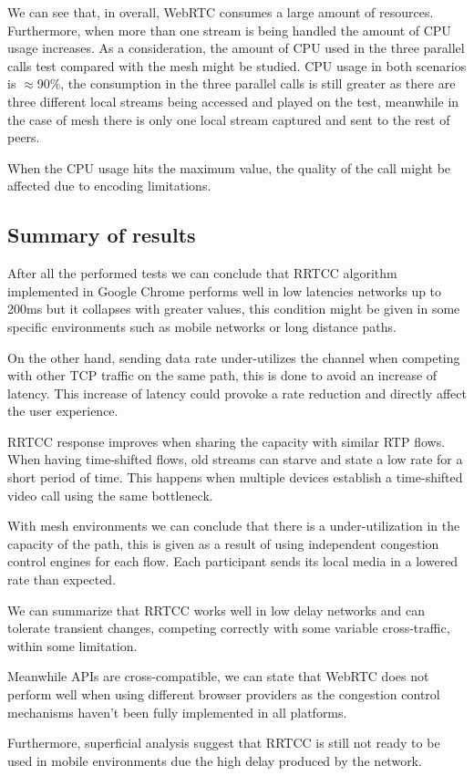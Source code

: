 We can see that, in overall, WebRTC consumes a large amount of resources. Furthermore, when more than one stream is being handled the amount of CPU usage increases. As a consideration, the amount of CPU used in the three parallel calls test compared with the mesh might be studied. CPU usage in both scenarios is $\approx$90\%, the consumption in the three parallel calls is still greater as there are three different local streams being accessed and played on the test, meanwhile in the case of mesh there is only one local stream captured and sent to the rest of peers.

When the CPU usage hits the maximum value, the quality of the call might be affected due to encoding limitations.

\subsection{Summary of results}

After all the performed tests we can conclude that RRTCC algorithm implemented in Google Chrome performs well in low latencies networks up to 200ms but it collapses with greater values, this condition might be given in some specific environments such as mobile networks or long distance paths. 

On the other hand, sending data rate under-utilizes the channel when competing with other TCP traffic on the same path, this is done to avoid an increase of latency. This increase of latency could provoke a rate reduction and directly affect the user experience.

RRTCC response improves when sharing the capacity with similar RTP flows. When having time-shifted flows, old streams can starve and state a low rate for a short period of time. This happens when multiple devices establish a time-shifted video call using the same bottleneck.

With mesh environments we can conclude that there is a under-utilization in the capacity of the path, this is given as a result of using independent congestion control engines for each flow. Each participant sends its local media in a lowered rate than expected.

We can summarize that RRTCC works well in low delay networks and can tolerate transient changes, competing correctly with some variable cross-traffic, within some limitation. 

Meanwhile APIs are cross-compatible, we can state that WebRTC does not perform well when using different browser providers as the congestion control mechanisms haven't been fully implemented in all platforms.

Furthermore, superficial analysis suggest that RRTCC is still not ready to be used in mobile environments due the high delay produced by the network. 
